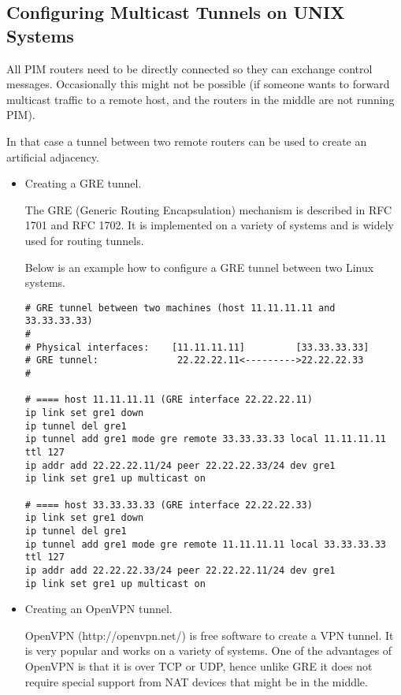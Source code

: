 \subsection{Configuring Multicast Tunnels on UNIX Systems}

All PIM routers need to be directly connected so they can exchange
control messages. Occasionally this might not be possible (\eg if
someone wants to forward multicast traffic to a remote host, and the
routers in the middle are not running PIM).

In that case a tunnel between two remote routers can be used to create
an artificial adjacency.

\begin{itemize}

  \item Creating a GRE tunnel.

  The GRE (Generic Routing Encapsulation) mechanism is described in RFC
  1701 and RFC 1702. It is implemented on a variety of systems and is
  widely used for routing tunnels.

  Below is an example how to configure a GRE tunnel between two Linux
  systems.

\begin{verbatim}
# GRE tunnel between two machines (host 11.11.11.11 and 33.33.33.33)
#
# Physical interfaces:    [11.11.11.11]         [33.33.33.33]
# GRE tunnel:              22.22.22.11<--------->22.22.22.33
#

# ==== host 11.11.11.11 (GRE interface 22.22.22.11)
ip link set gre1 down
ip tunnel del gre1
ip tunnel add gre1 mode gre remote 33.33.33.33 local 11.11.11.11 ttl 127
ip addr add 22.22.22.11/24 peer 22.22.22.33/24 dev gre1
ip link set gre1 up multicast on

# ==== host 33.33.33.33 (GRE interface 22.22.22.33)
ip link set gre1 down
ip tunnel del gre1
ip tunnel add gre1 mode gre remote 11.11.11.11 local 33.33.33.33 ttl 127
ip addr add 22.22.22.33/24 peer 22.22.22.11/24 dev gre1
ip link set gre1 up multicast on
\end{verbatim}


  \item Creating an OpenVPN tunnel.

  OpenVPN (http://openvpn.net/) is free software to create a VPN tunnel.
  It is very popular and works on a variety of systems.
  One of the advantages of OpenVPN is that it is over TCP or UDP,
  hence unlike GRE it does not require special support from NAT devices
  that might be in the middle.


\end{itemize}
